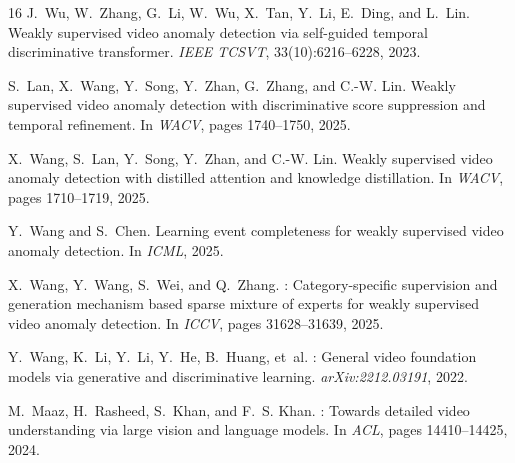 \documentclass[sigconf,nonacm]{acmart}
\begin{document}
\begin{thebibliography}{16}
J.~Wu, W.~Zhang, G.~Li, W.~Wu, X.~Tan, Y.~Li, E.~Ding, and L.~Lin.
\newblock Weakly supervised video anomaly detection via self-guided temporal
  discriminative transformer.
\newblock \emph{IEEE TCSVT}, 33(10):6216--6228, 2023.

S.~Lan, X.~Wang, Y.~Song, Y.~Zhan, G.~Zhang, and C.-W. Lin.
\newblock Weakly supervised video anomaly detection with discriminative score
  suppression and temporal refinement.
\newblock In \emph{WACV}, pages 1740--1750, 2025.

X.~Wang, S.~Lan, Y.~Song, Y.~Zhan, and C.-W. Lin.
\newblock Weakly supervised video anomaly detection with distilled attention
  and knowledge distillation.
\newblock In \emph{WACV}, pages 1710--1719, 2025.

Y.~Wang and S.~Chen.
\newblock Learning event completeness for weakly supervised video anomaly
  detection.
\newblock In \emph{ICML}, 2025.

X.~Wang, Y.~Wang, S.~Wei, and Q.~Zhang.
: Category-specific supervision and generation mechanism
  based sparse mixture of experts for weakly supervised video anomaly
  detection.
\newblock In \emph{ICCV}, pages 31628--31639, 2025.

Y.~Wang, K.~Li, Y.~Li, Y.~He, B.~Huang, et~al.
: General video foundation models via generative and
  discriminative learning.
\newblock \emph{arXiv:2212.03191}, 2022.

M.~Maaz, H.~Rasheed, S.~Khan, and F.~S. Khan.
: Towards detailed video understanding via large
  vision and language models.
\newblock In \emph{ACL}, pages 14410--14425, 2024.

\end{thebibliography}
\end{document}
